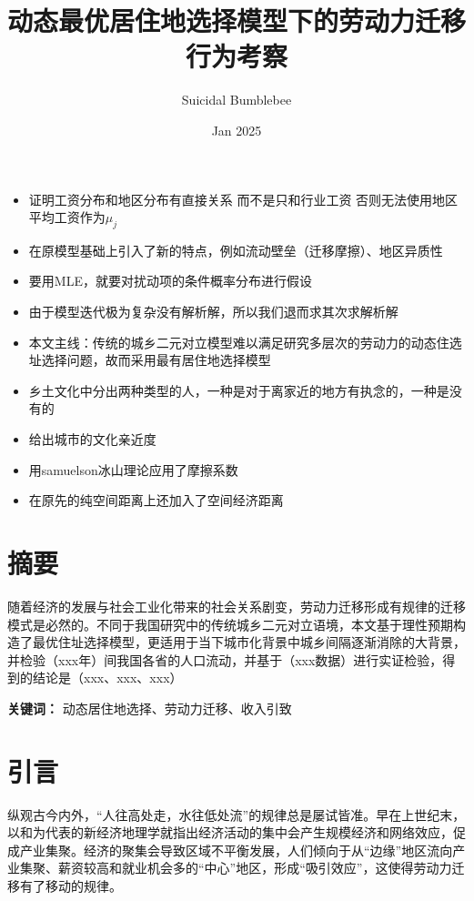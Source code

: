 \documentclass[a4paper,10pt]{article}
\title{动态最优居住地选择模型下的劳动力迁移行为考察}
\author{Suicidal Bumblebee}
\date{Jan 2025}
\begin{document}
\maketitle

\begin{itemize}
  \item 证明工资分布和地区分布有直接关系 而不是只和行业工资 否则无法使用地区平均工资作为$\mu_{j}$
  \item 在原模型基础上引入了新的特点，例如流动壁垒（迁移摩擦）、地区异质性
  \item 要用MLE，就要对扰动项的条件概率分布进行假设
  \item 由于模型迭代极为复杂没有解析解，所以我们退而求其次求解析解
  \item 本文主线：传统的城乡二元对立模型难以满足研究多层次的劳动力的动态住选址选择问题，故而采用最有居住地选择模型
  \item 乡土文化中分出两种类型的人，一种是对于离家近的地方有执念的，一种是没有的
  \item 给出城市的文化亲近度
  \item 用samuelson冰山理论应用了摩擦系数
  \item 在原先的纯空间距离上还加入了空间经济距离
\end{itemize}

\section*{摘要}
随着经济的发展与社会工业化带来的社会关系剧变，劳动力迁移形成有规律的迁移模式是必然的。不同于我国研究中的传统城乡二元对立语境，本文基于理性预期构造了最优住址选择模型，更适用于当下城市化背景中城乡间隔逐渐消除的大背景，并检验（xxx年）间我国各省的人口流动，并基于（xxx数据）进行实证检验，得到的结论是（xxx、xxx、xxx）

\textbf{关键词：} 动态居住地选择、劳动力迁移、收入引致

\section{引言}



纵观古今内外，“人往高处走，水往低处流”的规律总是屡试皆准。早在上世纪末，以\cite{krugmanIncreasingReturnsEconomic1991}和\cite{fujitaSpatialEconomyCities1999}为代表的新经济地理学就指出经济活动的集中会产生规模经济和网络效应，促成产业集聚。经济的聚集会导致区域不平衡发展，人们倾向于从“边缘”地区流向产业集聚、薪资较高和就业机会多的“中心”地区，形成“吸引效应”，这使得劳动力迁移有了移动的规律。
\end{document}

